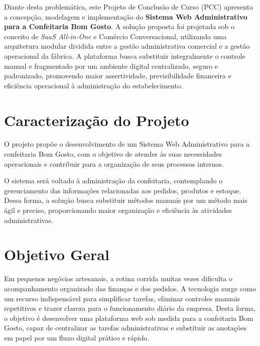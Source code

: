 Diante desta problemática, este Projeto de Conclusão de Curso (PCC) apresenta a concepção, modelagem e implementação do \textbf{Sistema Web Administrativo para a Confeitaria Bom Gosto}. A solução proposta foi projetada sob o conceito de \textit{SaaS All-in-One} e Comércio Conversacional, utilizando uma arquitetura modular dividida entre a gestão administrativa comercial e a gestão operacional da fábrica. A plataforma busca substituir integralmente o controle manual e fragmentado por um ambiente digital centralizado, seguro e padronizado, promovendo maior assertividade, previsibilidade financeira e eficiência operacional à administração do estabelecimento.

\section{Caracterização do Projeto}
O projeto propõe o desenvolvimento de um Sistema Web Administrativo para a confeitaria Bom Gosto,
com o objetivo de atender às suas necessidades operacionais e contribuir para a organização de seus
processos internos.

O sistema será voltado à administração da confeitaria, contemplando o gerenciamento das informações 
relacionadas aos pedidos, produtos e estoque. Dessa forma, a solução busca substituir métodos manuais
por um método mais ágil e preciso, proporcionando maior organização e eficiência às atividades administrativas.

\section{Objetivo Geral} 
Em pequenos negócios artesanais, a rotina corrida muitas vezes dificulta o acompanhamento organizado das finanças e dos pedidos. A tecnologia surge como um recurso indispensável para simplificar tarefas, eliminar controles manuais repetitivos e trazer clareza para o funcionamento diário da empresa. Desta forma, o objetivo é desenvolver uma plataforma web sob medida para a confeitaria Bom Gosto, capaz de centralizar as tarefas administrativas e substituir as anotações em papel por um fluxo digital prático e rápido. 

